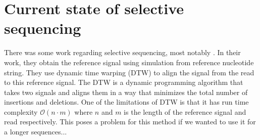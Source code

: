 \section{Current state of selective sequencing}


There was some work regarding selective sequencing, most notably \cite{loose2016real}. In their
work, they obtain the reference signal using simulation from reference nucleotide
string. They use dynamic time warping (DTW) to align the signal from the read to
this reference signal. The DTW is a dynamic programming algorithm that takes two signals and aligns them in a
way that minimizes the total number of insertions and deletions. One of the limitations
of DTW is that it has run time complexity $\mathcal{O}(n\cdot m)$ where $n$ and $m$
is the length of the reference signal and read respectively. This poses a problem
for this method if we wanted to use it for a longer sequences...
